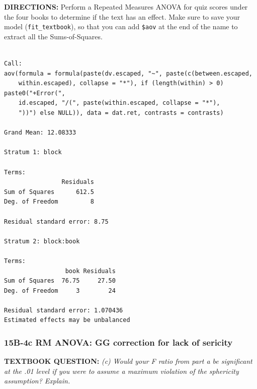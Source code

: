 \documentclass[]{article}
\newenvironment{Shaded}{\begin{snugshade}}{\end{snugshade}}
\newcommand{\KeywordTok}[1]{\textcolor[rgb]{0.13,0.29,0.53}{\textbf{#1}}}
\newcommand{\DataTypeTok}[1]{\textcolor[rgb]{0.13,0.29,0.53}{#1}}
\newcommand{\DecValTok}[1]{\textcolor[rgb]{0.00,0.00,0.81}{#1}}
\newcommand{\StringTok}[1]{\textcolor[rgb]{0.31,0.60,0.02}{#1}}
\newcommand{\CommentTok}[1]{\textcolor[rgb]{0.56,0.35,0.01}{\textit{#1}}}
\newcommand{\OperatorTok}[1]{\textcolor[rgb]{0.81,0.36,0.00}{\textbf{#1}}}
\newcommand{\NormalTok}[1]{#1}
\begin{document}
\textbf{DIRECTIONS:} Perform a Repeated Measures ANOVA for quiz scores
under the four books to determine if the text has an effect. Make sure
to save your model (\texttt{fit\_textbook}), so that you can add
\texttt{\$aov} at the end of the name to extract all the
Sums-of-Squares.

\begin{Shaded}
\end{Shaded}

\begin{verbatim}

Call:
aov(formula = formula(paste(dv.escaped, "~", paste(c(between.escaped, 
    within.escaped), collapse = "*"), if (length(within) > 0) paste0("+Error(", 
    id.escaped, "/(", paste(within.escaped, collapse = "*"), 
    "))") else NULL)), data = dat.ret, contrasts = contrasts)

Grand Mean: 12.08333

Stratum 1: block

Terms:
                Residuals
Sum of Squares      612.5
Deg. of Freedom         8

Residual standard error: 8.75

Stratum 2: block:book

Terms:
                 book Residuals
Sum of Squares  76.75     27.50
Deg. of Freedom     3        24

Residual standard error: 1.070436
Estimated effects may be unbalanced
\end{verbatim}

\clearpage

\subsubsection{15B-4c RM ANOVA: GG correction for lack of
sericity}\label{b-4c-rm-anova-gg-correction-for-lack-of-sericity}

\textbf{TEXTBOOK QUESTION:} \emph{(c) Would your F ratio from part a be
significant at the .01 level if you were to assume a maximum violation
of the sphericity assumption? Explain. }
\end{document}
